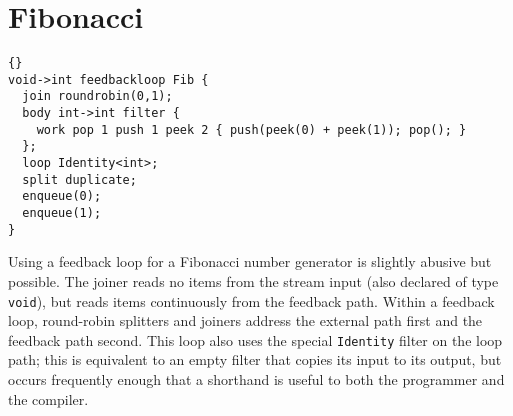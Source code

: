 \section{Fibonacci}

\begin{lstlisting}{}
void->int feedbackloop Fib {
  join roundrobin(0,1);
  body int->int filter { 
    work pop 1 push 1 peek 2 { push(peek(0) + peek(1)); pop(); }
  };
  loop Identity<int>;
  split duplicate;
  enqueue(0);
  enqueue(1);
}
\end{lstlisting}

Using a feedback loop for a Fibonacci number generator is slightly
abusive but possible.  The joiner reads no items from the stream input
(also declared of type \lstinline|void|), but reads items continuously
from the feedback path.  Within a feedback loop, round-robin splitters
and joiners address the external path first and the feedback path
second.  This loop also uses the special \lstinline|Identity| filter
on the loop path; this is equivalent to an empty filter that copies
its input to its output, but occurs frequently enough that a shorthand
is useful to both the programmer and the compiler.
